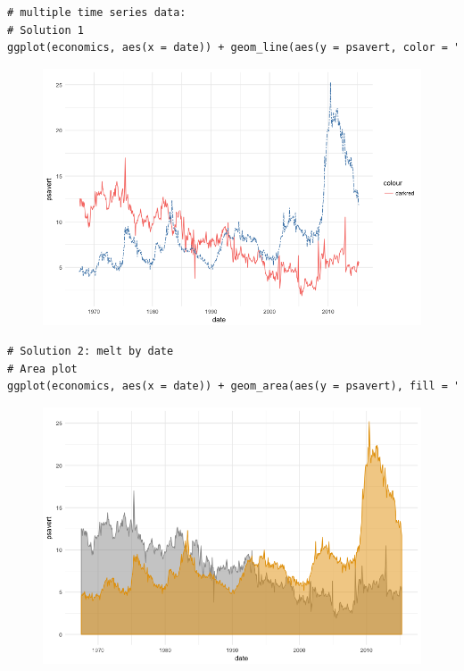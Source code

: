 \begin{lstlisting}[language=html]
# multiple time series data:
# Solution 1
ggplot(economics, aes(x = date)) + geom_line(aes(y = psavert, color = "darkred")) + geom_line(aes(y = uempmed), color = "steelblue", linetype = "twodash") + theme_minimal()
\end{lstlisting}
\begin{figure}[H]\begin{center}\includegraphics[scale=1 ]{ilu/bg128.png}\end{center}\end{figure}
\begin{lstlisting}[language=html]
# Solution 2: melt by date
# Area plot
ggplot(economics, aes(x = date)) + geom_area(aes(y = psavert), fill = "#999999", color = "#999999", alpha = 0.5) + geom_area(aes(y = uempmed), fill = "#E69F00", color = "#E69F00", alpha = 0.5) + theme_minimal()
\end{lstlisting}
\begin{figure}[H]\begin{center}\includegraphics[scale=1 ]{ilu/bg129.png}\end{center}\end{figure}

